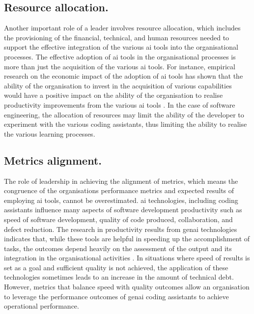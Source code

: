\subsection {Resource allocation.}
\label{sec:Resource allocation}
Another important role of a leader involves resource allocation, which includes the provisioning of the financial, technical, and human resources needed to support the effective integration of the various \gls{ai} tools into the organisational processes. The effective adoption of \gls{ai} tools in the organisational processes is more than just the acquisition of the various \gls{ai} tools. For instance, empirical research on the economic impact of the adoption of \gls{ai} tools has shown that the ability of the organisation to invest in the acquisition of various capabilities would have a positive impact on the ability of the organisation to realise productivity improvements from the various \gls{ai} tools \autocite{Babina2024}. In the case of software engineering, the allocation of resources may limit the ability of the developer to experiment with the various coding assistants, thus limiting the ability to realise the various learning processes.

\subsection {Metrics alignment.}
\label{sec:Metrics alignment}
The role of leadership in achieving the alignment of metrics, which means the congruence of the organisations performance metrics and expected results of employing \gls{ai} tools, cannot be overestimated. \gls{ai} technologies, including coding assistants influence many aspects of software development productivity such as speed of software development, quality of code produced, collaboration, and defect reduction. The research in productivity results from \gls{genai} technologies indicates that, while these tools are helpful in speeding up the accomplishment of tasks, the outcomes depend heavily on the assessment of the output and its integration in the organisational activities \autocite{Noy2023}. In situations where speed of results is set as a goal and sufficient quality is not achieved, the application of these technologies sometimes leads to an increase in the amount of technical debt. However, metrics that balance speed with quality outcomes allow an organisation to leverage the performance outcomes of \gls{genai} coding assistants to achieve operational performance.

